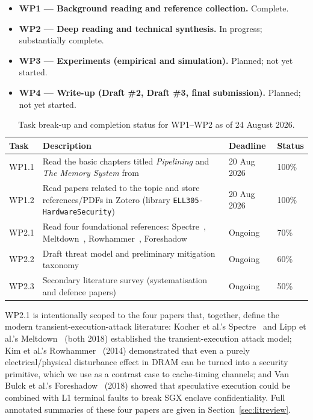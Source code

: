 \documentclass[11pt,a4paper]{article}
\begin{document}
\begin{itemize}[leftmargin=1.4em]
\item \textbf{WP1 --- Background reading and reference collection.} Complete.
\item \textbf{WP2 --- Deep reading and technical synthesis.} In progress; substantially complete.
\item \textbf{WP3 --- Experiments (empirical and simulation).} Planned; not yet started.
\item \textbf{WP4 --- Write-up (Draft \#2, Draft \#3, final submission).} Planned; not yet started.
\end{itemize}
 
\begin{table}[h]
\centering
\small
\begin{tabular}{p{1.3cm}p{7.6cm}p{2cm}p{1.6cm}}
\toprule
\textbf{Task} & \textbf{Description} & \textbf{Deadline} & \textbf{Status} \\
\midrule
WP1.1 & Read the basic chapters titled \emph{Pipelining} and \emph{The Memory System} from~\cite{sarangi2025basic} & 20 Aug 2026 & 100\% \\
WP1.2 & Read papers related to the topic and store references/PDFs in Zotero (library \texttt{ELL305-HardwareSecurity}) & 20 Aug 2026 & 100\% \\
WP2.1 & Read four foundational references: Spectre~\cite{kocher2019spectre}, Meltdown~\cite{lipp2018meltdown}, Rowhammer~\cite{kim2014rowhammer}, Foreshadow~\cite{vanbulck2018foreshadow} & Ongoing & 70\% \\
WP2.2 & Draft threat model and preliminary mitigation taxonomy & Ongoing & 60\% \\
WP2.3 & Secondary literature survey (systematisation and defence papers) & Ongoing & 50\% \\
\bottomrule
\end{tabular}
\caption{Task break-up and completion status for WP1--WP2 as of 24 August 2026.}
\label{tab:tasks}
\end{table}
 
WP2.1 is intentionally scoped to the four papers that, together, define the modern transient-execution-attack literature: Kocher et al.'s Spectre~\cite{kocher2019spectre} and Lipp et al.'s Meltdown~\cite{lipp2018meltdown} (both 2018) established the transient-execution attack model; Kim et al.'s Rowhammer~\cite{kim2014rowhammer} (2014) demonstrated that even a purely electrical/physical disturbance effect in DRAM can be turned into a security primitive, which we use as a contrast case to cache-timing channels; and Van Bulck et al.'s Foreshadow~\cite{vanbulck2018foreshadow} (2018) showed that speculative execution could be combined with L1 terminal faults to break SGX enclave confidentiality. Full annotated summaries of these four papers are given in Section~\ref{sec:litreview}.
\end{document}
